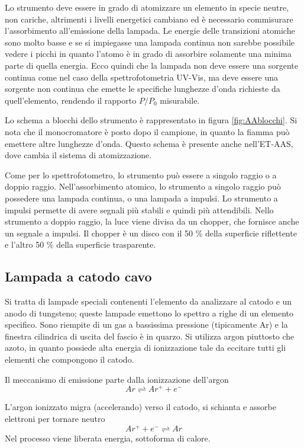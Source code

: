 Lo strumento deve essere in grado di atomizzare un elemento in specie neutre, non cariche, altrimenti i livelli energetici cambiano ed è necessario commisurare l'assorbimento all'emissione della lampada.
Le energie delle transizioni atomiche sono molto basse e se si impiegasse una lampada continua non sarebbe possibile vedere i picchi in quanto l'atomo è in grado di assorbire solamente una minima parte di quella energia.
Ecco quindi che la lampada non deve essere una sorgente continua come nel caso della spettrofotometria UV-Vis, ma deve essere una sorgente non continua che emette le specifiche lunghezze d'onda richieste da quell'elemento, rendendo il rapporto $P/P_0$ misurabile.

Lo schema a blocchi dello strumento è rappresentato in figura \ref{fig:AAblocchi}.
Si nota che il monocromatore è posto dopo il campione, in quanto la fiamma può emettere altre lunghezze d'onda.
Questo schema è presente anche nell'ET-AAS, dove cambia il sistema di atomizzazione.


Come per lo spettrofotometro, lo strumento può essere a singolo raggio o a doppio raggio.
Nell'assorbimento atomico, lo strumento a singolo raggio può possedere una lampada continua, o una lampada a impulsi.
Lo strumento a impulsi permette di avere segnali più stabili e quindi più attendibili.
Nello strumento a doppio raggio, la luce viene divisa da un chopper, che fornisce anche un segnale a impulsi.
Il chopper è un disco con il 50 \% della superficie riflettente e l'altro 50 \% della superficie trasparente.

\subsection{Lampada a catodo cavo}
Si tratta di lampade speciali contenenti l'elemento da analizzare al catodo e un anodo di tungsteno; queste lampade emettono lo spettro a righe di un elemento specifico.
Sono riempite di un gas a bassissima pressione (tipicamente Ar) e la finestra cilindrica di uscita del fascio è in quarzo.
Si utilizza argon piuttosto che azoto, in quanto possiede alta energia di ionizzazione tale da eccitare tutti gli elementi che compongono il catodo.

Il meccanismo di emissione parte dalla ionizzazione dell'argon
\[
Ar \rightleftharpoons Ar^+ + e^-
\]

L'argon ionizzato migra (accelerando) verso il catodo, si schianta e assorbe elettroni per tornare neutro
\[
Ar^+ + e^- \rightleftharpoons Ar
\]
Nel processo viene liberata energia, sottoforma di calore.

